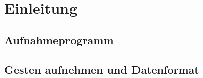 \section{Einleitung}

\subsection{Aufnahmeprogramm}

\subsection{Gesten aufnehmen und Datenformat}
\label{sec:gestures_dataformat}

\nocite{Gupta2012}